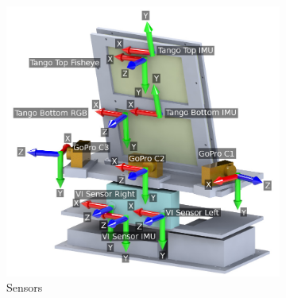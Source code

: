 \documentclass[conference]{IEEEtran}
\begin{document}
\begin{figure}[h]
\centering
\begin{subfigure}{0.35\textwidth}
\centering
\includegraphics[width = \textwidth]{figures/rig.jpg}
\caption{Sensors}
\label{fig:sensor_on_rig}
\end{subfigure}
\begin{subfigure}{0.12\textwidth}
\centering

\end{subfigure}
\end{figure}
\end{document}
